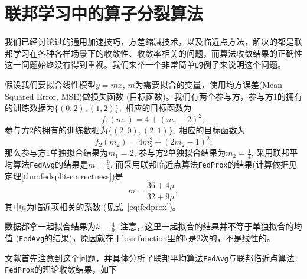 \section{联邦学习中的算子分裂算法}
\label{sec:chap2-operator-split}

我们已经讨论过的通用加速技巧\cite{reddi2020fed_opt}，方差缩减技术\cite{karimireddy2020scaffold}，以及临近点方法\cite{sahu2018fedprox}，解决的都是联邦学习在各种各样场景下的收敛性、收敛率相关的问题，而算法收敛结果的正确性这一问题始终没有得到重视。我们来举一个非常简单的例子来说明这个问题。

\begin{example}
\label{eg:correctness}
假设我们要拟合线性模型$y = mx$, $m$为需要拟合的变量，使用均方误差(Mean Squared Error, MSE)做损失函数 (目标函数)。我们有两个参与方，参与方1的拥有的训练数据为$\{ (0, 2), (1, 2) \},$ 相应的目标函数为
\begin{equation*}
f_1(m_1) = 4 + (m_1 - 2)^2;
\end{equation*}
参与方2的拥有的训练数据为$\{ (2, 0), (2, 1) \},$ 相应的目标函数为
\begin{equation*}
f_2(m_2) = 4m_2^2 + (2m_2 - 1)^2.
\end{equation*}
那么参与方1单独拟合结果为$m_1 = 2$, 参与方2单独拟合结果为$m_2 = \frac{1}{4}$, 采用联邦平均算法\texttt{FedAvg}的结果是$m = \frac{9}{8}.$ 而采用联邦临近点算法\texttt{FedProx}的结果(计算依据见定理\ref{thm:fedsplit-correctness})是
\begin{equation}
\label{eq:eg-correctness-fedprox}
m = \frac{36 + 4\mu}{32 + 9\mu},
\end{equation}
其中$\mu$为临近项相关的系数 (见式~\eqref{eq:fedprox})。

数据都拿一起拟合结果为$k = \frac{4}{9}.$ 注意，这里一起拟合的结果并不等于单独拟合的均值 (\texttt{FedAvg}的结果)，原因就在于loss function里的k是2次的，不是线性的。
\end{example}

文献\cite{pathak2020fedsplit}首先注意到这个问题，并具体分析了联邦平均算法\texttt{FedAvg}与联邦临近点算法\texttt{FedProx}的理论收敛结果，如下

